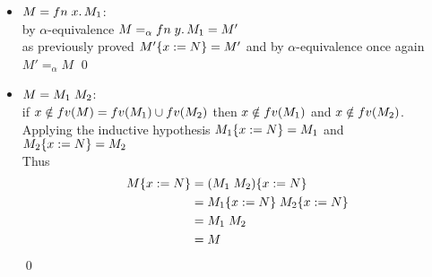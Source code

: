 \begin{itemize}
\begin{align*}
		                    & = \FN{y}{M_1}                                       \\
		                    & = M
	      \end{align*}
	      \qed
	\item $M = fn\;x.\,M_1$:\\
	      by $\alpha$-equivalence $M =_\alpha fn\;y.\,M_1 = M'$\\
	      as previously proved $M'\{x:=N\} = M'$ and by
	      $\alpha$-equivalence once again $M' =_\alpha M$
	      \qed
	\item $M = M_1\;M_2$:\\
	      if $x \notin fv(M) = fv(M_1) \cup fv(M_2)$ then $x \notin fv(M_1)$ and $x \notin fv(M_2)$.\\
	      Applying the inductive hypothesis $M_1\{x:=N\} = M_1$ and $M_2\{x:=N\} = M_2$\\
	      Thus
	      \begin{align*}
		      M\{x:=N\} & = (M_1\;M_2)\{x:=N\}           \\
		                    & = M_1\{x:=N\}\;M_2\{x:=N\} \\
		                    & = M_1\;M_2                         \\
		                    & = M
	      \end{align*}
	      \qed
\end{itemize}
